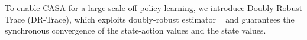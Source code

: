 
To enable CASA for a large scale off-policy learning, we introduce Doubly-Robust Trace (DR-Trace), which
exploits doubly-robust estimator ~\citep{dr} and guarantees the synchronous convergence of the state-action values and the state values. 



